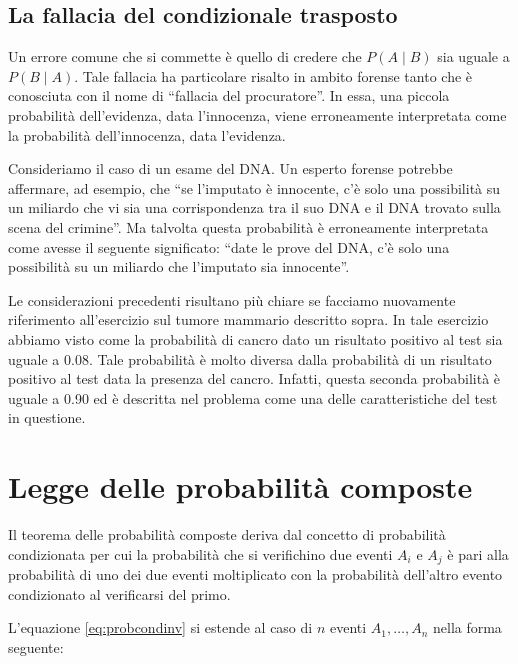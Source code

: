 \documentclass[
  11pt,
]{krantz}
\theoremstyle{definition}
\theoremstyle{definition}
\theoremstyle{definition}
\theoremstyle{definition}
\theoremstyle{remark}
\begin{document}
\hypertarget{la-fallacia-del-condizionale-trasposto}{%
\subsection{La fallacia del condizionale trasposto}\label{la-fallacia-del-condizionale-trasposto}}

Un errore comune che si commette è quello di credere che \(P(A \mid B)\) sia uguale a \(P(B \mid A)\). Tale fallacia ha particolare risalto in ambito forense tanto che è conosciuta con il nome di ``fallacia del procuratore''. In essa, una piccola probabilità dell'evidenza, data l'innocenza, viene erroneamente interpretata come la probabilità dell'innocenza, data l'evidenza.

Consideriamo il caso di un esame del DNA. Un esperto forense potrebbe affermare, ad esempio, che ``se l'imputato è innocente, c'è solo una possibilità su un miliardo che vi sia una corrispondenza tra il suo DNA e il DNA trovato sulla scena del crimine''. Ma talvolta questa probabilità è erroneamente interpretata come avesse il seguente significato: ``date le prove del DNA, c'è solo una possibilità su un miliardo che l'imputato sia innocente''.

Le considerazioni precedenti risultano più chiare se facciamo nuovamente riferimento all'esercizio sul tumore mammario descritto sopra. In tale esercizio abbiamo visto come la probabilità di cancro dato un risultato positivo al test sia uguale a 0.08. Tale probabilità è molto diversa dalla probabilità di un risultato positivo al test data la presenza del cancro. Infatti, questa seconda probabilità è uguale a 0.90 ed è descritta nel problema come una delle caratteristiche del test in questione.

\hypertarget{legge-delle-probabilituxe0-composte}{%
\section{Legge delle probabilità composte}\label{legge-delle-probabilituxe0-composte}}

Il teorema delle probabilità composte deriva dal concetto di probabilità condizionata per cui la probabilità che si verifichino due eventi \(A_i\) e \(A_j\) è pari alla probabilità di uno dei due eventi moltiplicato con la probabilità dell'altro evento condizionato al verificarsi del primo.

L'equazione \eqref{eq:probcondinv} si estende al caso di \(n\) eventi \(A_1, \dots, A_n\) nella forma seguente:
\end{document}
